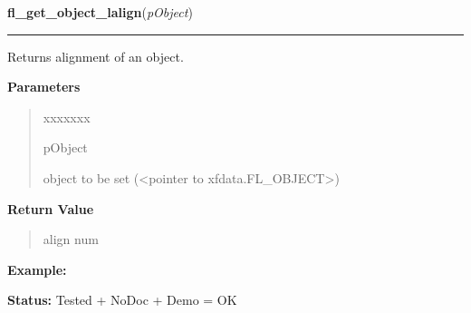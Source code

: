 \hspace{.8\funcindent}\begin{boxedminipage}{\funcwidth}

    \raggedright \textbf{fl\_get\_object\_lalign}(\textit{pObject})

    \vspace{-1.5ex}

    \rule{\textwidth}{0.5\fboxrule}
\setlength{\parskip}{2ex}
    Returns alignment of an object.

\setlength{\parskip}{1ex}
      \textbf{Parameters}
      \vspace{-1ex}

      \begin{quote}
        \begin{Ventry}{xxxxxxx}

          \item[pObject]

          object to be set ({\textless}pointer to 
          xfdata.FL\_OBJECT{\textgreater})

        \end{Ventry}

      \end{quote}

      \textbf{Return Value}
    \vspace{-1ex}

      \begin{quote}
      align num

      \end{quote}

\textbf{Example:} 

\textbf{Status:} Tested + NoDoc + Demo = OK



    \end{boxedminipage}

    \label{xformslib:library:fl_set_object_lalign}

    \vspace{0.5ex}

